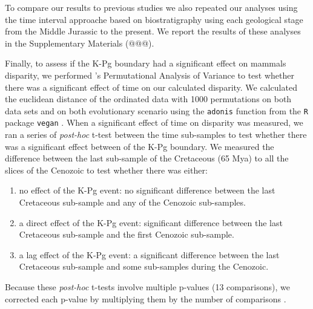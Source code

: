 \documentclass[12pt,letterpaper]{article}
\begin{document}
To compare our results to previous studies we also repeated our analyses using the time interval approache based on biostratigraphy \citep[e.g.][]{cisneros2010,prentice2011,Hughes20082013,bentonmodels2014} using each geological stage from the Middle Jurassic to the present.
We report the results of these analyses in the Supplementary Materials (@@@). %

Finally, to assess if the K-Pg boundary had a significant effect on mammals disparity, we performed \cite{permanova}'s Permutational Analysis of Variance \citep[also referred to as PERMANOVA or NPANOVA; e.g.][]{brusatte50,ruta2013} to test whether there was a significant effect of time on our calculated disparity.
We calculated the euclidean distance of the ordinated data with 1000 permutations on both data sets and on both evolutionary scenario using the \texttt{adonis} function from the \texttt{R} package \texttt{vegan} \citep{vegan}.
When a significant effect of time on disparity was measured, we ran a series of \textit{post-hoc} t-test between the time sub-samples \citep{anderson2012using,zelditch2012geometric,smith2014joined} to test whether there was a significant effect between of the K-Pg boundary.
We measured the difference between the last sub-sample of the Cretaceous (65 Mya) to all the slices of the Cenozoic to test whether there was either:
\begin{enumerate}
    \item{no effect of the K-Pg event: no significant difference between the last Cretaceous sub-sample and any of the Cenozoic sub-samples.}
    \item{a direct effect of the K-Pg event: significant difference between the last Cretaceous sub-sample and the first Cenozoic sub-sample.}
    \item{a lag effect of the K-Pg event: a significant difference between the last Cretaceous sub-sample and some sub-samples during the Cenozoic.}
\end{enumerate}
Because these \textit{post-hoc} t-tests involve multiple p-values (13 comparisons), we corrected each p-value by multiplying them by the number of comparisons \citep[Holm-Bonferonni correction;][]{holm1979simple}.
\end{document}
